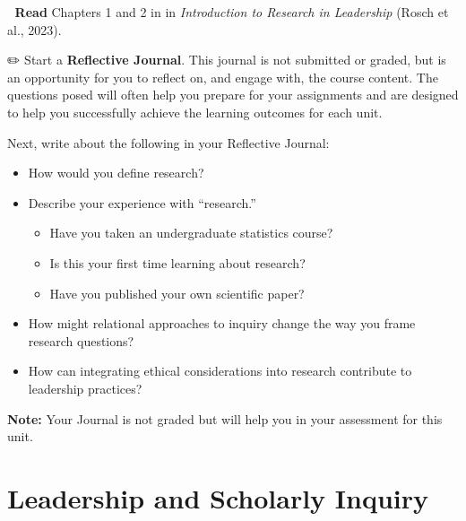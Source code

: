 \documentclass[
  letterpaper,
  DIV=11,
  numbers=noendperiod]{scrreprt}
\providecommand{\tightlist}{%
  \setlength{\itemsep}{0pt}\setlength{\parskip}{0pt}}\usepackage{longtable,booktabs,array}
\begin{document}
📖 \textbf{Read} Chapters 1 and 2 in in \emph{Introduction to Research
in Leadership} (Rosch et al., 2023).

✏️ Start a \textbf{Reflective Journal}. This journal is not submitted or
graded, but is an opportunity for you to reflect on, and engage with,
the course content. The questions posed will often help you prepare for
your assignments and are designed to help you successfully achieve the
learning outcomes for each unit.

Next, write about the following in your Reflective Journal:

\begin{itemize}
\tightlist
\item
  How would you define research?
\item
  Describe your experience with ``research.''

  \begin{itemize}
  \tightlist
  \item
    Have you taken an undergraduate statistics course?
  \item
    Is this your first time learning about research?
  \item
    Have you published your own scientific paper?
  \end{itemize}
\item
  How might relational approaches to inquiry change the way you frame
  research questions?
\item
  How can integrating ethical considerations into research contribute to
  leadership practices?
\end{itemize}

\textbf{Note:} Your Journal is not graded but will help you in your
assessment for this unit.

\subsection*{}\label{section}


\chapter*{Leadership and Scholarly
Inquiry}\label{leadership-and-scholarly-inquiry}

\end{document}
